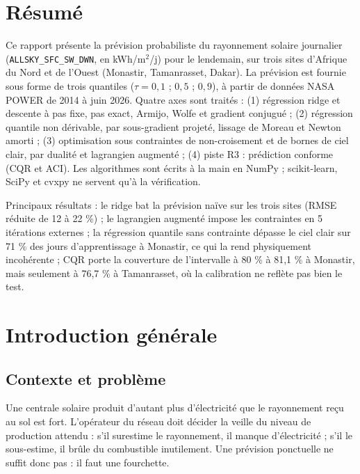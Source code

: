 \documentclass[11pt,a4paper]{article}
\theoremstyle{remark}
\theoremstyle{definition}
\begin{document}
\section*{Résumé}
Ce rapport présente la prévision probabiliste du rayonnement solaire journalier (\texttt{ALLSKY\_SFC\_SW\_DWN}, en kWh/m$^2$/j)
pour le lendemain, sur trois sites d'Afrique du Nord et de l'Ouest (Monastir, Tamanrasset, Dakar). La prévision est fournie
sous forme de trois quantiles ($\tau = 0{,}1$ ; $0{,}5$ ; $0{,}9$), à partir de données NASA POWER de 2014 à juin 2026.
Quatre axes sont traités : (1) régression ridge et descente à pas fixe, pas exact, Armijo, Wolfe et gradient conjugué ;
(2) régression quantile non dérivable, par sous-gradient projeté, lissage de Moreau et Newton amorti ;
(3) optimisation sous contraintes de non-croisement et de bornes de ciel clair, par dualité et lagrangien augmenté ;
(4) piste R3 : prédiction conforme (CQR et ACI). Les algorithmes sont écrits à la main en NumPy ; scikit-learn, SciPy et cvxpy
ne servent qu'à la vérification.

Principaux résultats : le ridge bat la prévision naïve sur les trois sites (RMSE réduite de 12 à 22 \%) ; le lagrangien
augmenté impose les contraintes en 5 itérations externes ; la régression quantile sans contrainte dépasse le ciel clair sur 71 \% des jours
d'apprentissage à Monastir, ce qui la rend physiquement incohérente ; CQR porte la couverture de l'intervalle à 80 \% à 81,1 \% à Monastir,
mais seulement à 76,7 \% à Tamanrasset, où la calibration ne reflète pas bien le test.

\clearpage
\tableofcontents
\clearpage

\section{Introduction générale}
\subsection{Contexte et problème}
Une centrale solaire produit d'autant plus d'électricité que le rayonnement reçu au sol est fort. L'opérateur du réseau doit
décider la veille du niveau de production attendu : s'il surestime le rayonnement, il manque d'électricité ; s'il le sous-estime,
il brûle du combustible inutilement. Une prévision ponctuelle ne suffit donc pas : il faut une fourchette.
\end{document}

